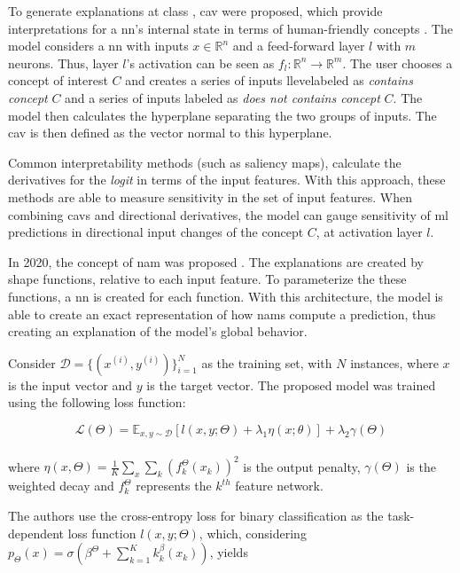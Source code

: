 To generate explanations at class , \gls{cav} were proposed, which provide interpretations for a \gls{nn}’s internal state in terms of human-friendly concepts \cite{TCAV}.
The model considers a \gls{nn} with inputs $x \in \mathbb{R}^n$ and a feed-forward layer $l$ with $m$ neurons. Thus, layer $l$'s activation can be seen as $f_l:\mathbb{R}^n \rightarrow \mathbb{R}^m$.
The user chooses a concept of interest $C$ and creates a series of inputs llevelabeled as \textit{contains concept} $C$ and a series of inputs labeled as \textit{does not contains concept} $C$. The model then calculates the hyperplane separating the two groups of inputs. The \gls{cav} is then defined as the vector normal to this hyperplane. 

Common interpretability methods (such as saliency maps), calculate the derivatives for the \textit{logit} in terms of the input features. With this approach, these methods are able to measure sensitivity in the set of input features. When combining \gls{cav}s and directional derivatives, the model can gauge sensitivity of \gls{ml} predictions in directional input changes of the concept $C$, at activation layer $l$.

In 2020, the concept of \gls{nam} was proposed \cite{NAM}. The explanations are created by shape functions, relative to each input feature. To parameterize the these functions, a \gls{nn} is created for each function. With this architecture, the model is able to create an exact representation of how \gls{nam}s compute a prediction, thus creating an explanation of the model's global behavior.

Consider $\mathcal{D} = \{(x^{(i)}, y^{(i)})\}_{i=1}^N$ as the training set, with $N$ instances, where $x$ is the input vector and $y$ is the target vector. The proposed model was trained using the following loss function:

\begin{equation}
\mathcal{L}(\Theta) = \mathds{E}_{x,y \sim \mathcal{D}} [l(x,y;\Theta) + \lambda_1\eta (x;\theta)] + \lambda_2 \gamma(\Theta)
\end{equation}
\\
where $\eta(x,\Theta) = \frac{1}{K} \sum_x \sum_k (f_k^\Theta (x_k))^2$ is the output penalty, $\gamma(\Theta)$ is the weighted decay and $f_k^\Theta$ represents the $k^{th}$ feature network.

The authors use the cross-entropy loss for binary classification as the task-dependent loss function $l(x,y;\Theta)$, which, considering $p_\Theta(x) = \sigma(\beta^\Theta +  \sum_{k=1}^K k_k^\beta(x_k))$, yields  

